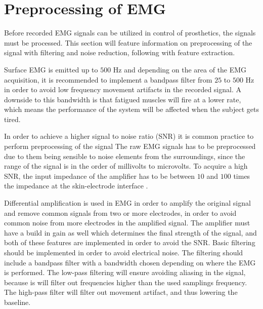 \section{Preprocessing of EMG}

Before recorded EMG signals can be utilized in control of prosthetics, the signals must be processed. This section will feature information on preprocessing of the signal with filtering and noise reduction, following with feature extraction.

Surface EMG is emitted up to $500$ Hz and depending on the area of the EMG acquisition, it is recommended to implement a bandpass filter from $25$ to $500$ Hz in order to avoid low frequency movement artifacts in the recorded signal. 
A downside to this bandwidth is that fatigued muscles will fire at a lower rate, which means the performance of the system will be affected when the subject gets tired. \cite{cram2012} %

In order to achieve a higher signal to noise ratio (SNR) it is common practice to perform preprocessing of the signal%
The raw EMG signals has to be preprocessed due to them being sensible to noise elements from the surroundings, since the range of the signal is in the order of millivolts to microvolts. To acquire a high SNR, the input impedance of the amplifier has to be between $10$ and $100$ times the impedance at the skin-electrode interface \cite{cram2012}.


Differential amplification is used in EMG in order to amplify the original signal and remove common signals from two or more electrodes, in order to avoid common noise from more electrodes in the amplified signal. The amplifier must have a build in gain as well which determines the final strength of the signal, and both of these features are implemented in order to avoid the SNR. Basic filtering should be implemented in order to avoid electrical noise. 
The filtering should include a bandpass filter with a bandwidth chosen depending on where the EMG is performed. The low-pass filtering will ensure avoiding aliasing in the signal, because is will filter out frequencies higher than the used samplings frequency. The high-pass filter will filter out movement artifact, and thus lowering the baseline. 


